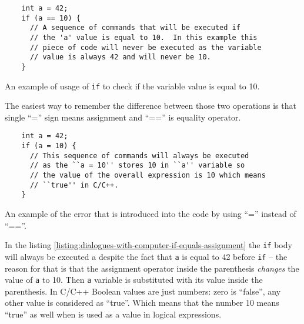 \documentclass[../sparc.tex]{subfiles}
\begin{document}
\begin{listing}[ht]
  \begin{verbatim}
    int a = 42;
    if (a == 10) {
      // A sequence of commands that will be executed if
      // the 'a' value is equal to 10.  In this example this
      // piece of code will never be executed as the variable
      // value is always 42 and will never be 10.
    }
  \end{verbatim}
  \label{listing:dialogues-with-computer-if-equals}
  \caption{An example of usage of \texttt{if} to check if the variable value is
    equal to 10.}
\end{listing}


The easiest way to remember the difference between those two operations is that
single ``='' sign means assignment and ``=='' is equality operator.

\begin{listing}[ht]
  \begin{verbatim}
    int a = 42;
    if (a = 10) {
      // This sequence of commands will always be executed
      // as the ``a = 10'' stores 10 in ``a'' variable so
      // the value of the overall expression is 10 which means
      // ``true'' in C/C++.
    }
  \end{verbatim}
  \label{listing:dialogues-with-computer-if-equals-assignment}
  \caption{An example of the error that is introduced into the code by using
    ``='' instead of ``==''.}
\end{listing}

In the listing \ref{listing:dialogues-with-computer-if-equals-assignment} the
\texttt{if} body will always be executed a despite the fact that \texttt{a} is
equal to 42 before \texttt{if} -- the reason for that is that the assignment
operator inside the parenthesis \emph{changes} the value of \texttt{a} to 10.
Then \texttt{a} variable is substituted with its value inside the parenthesis.
In C/C++ Boolean values are just numbers: zero is ``false'', any other value is
considered as ``true''.  Which means that the number 10 means ``true'' as well
when is used as a value in logical expressions.
\end{document}
